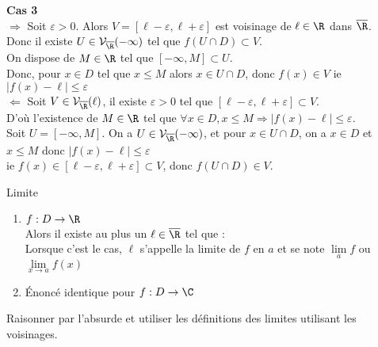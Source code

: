 \documentclass[12pt,a4paper]{report}
\begin{document}
\begin{demo}
\textbf{Cas 3} \\
	$\Longrightarrow$ Soit $\varepsilon > 0$. Alors $V=[\ell-\varepsilon,\ell+\varepsilon]$ est voisinage de $\ell \in \R$ dans $\overline{\R}$. \\
Donc il existe $U \in \mathcal{V}_{\overline{\R}}(-\infty)$ tel que $f(U \cap D) \subset V$. \\
On dispose de $M \in \R$ tel que $[-\infty,M] \subset U$. \\
Donc, pour $x \in D$ tel que $x \leq M$ alors $x \in U \cap D$, donc $f(x) \in V$ ie $\lvert f(x)-\ell \rvert \leq \varepsilon$ \\

	$\Longleftarrow$ Soit $V \in \mathcal{V}_{\overline{\R}}(\ell)$, il existe $\varepsilon > 0$ tel que $[\ell-\varepsilon, \ell + \varepsilon] \subset V$. \\
D'où l'existence de $M \in \R$ tel que $\forall x \in D, x \leq M \Longrightarrow \lvert f(x)-\ell \rvert \leq \varepsilon$. \\
Soit $U = [-\infty, M]$. On a $U \in \mathcal{V}_{\overline{\R}}(-\infty)$, et pour $x \in U \cap D$, on a $x \in D$ et $x \leq M$ donc $\lvert f(x)-\ell \rvert \leq \varepsilon$ \\
ie $f(x) \in [\ell-\varepsilon,\ell + \varepsilon] \subset V$, donc $f(U \cap D) \in V$.

\end{demo}
\begin{definition}{Limite}{}
\begin{enumerate}
    \item $f:D \rightarrow \R$\\
    Alors il existe au plus un $\ell \in \overline{\R}$ tel que : \\
    Lorsque c'est le cas, $\ell$ s'appelle la limite de $f$ en $a$ et se note $\lim\limits_a f$ ou $\lim\limits_{x \rightarrow a} f(x)$
    \item Énoncé identique pour $f:D \rightarrow \C$
\end{enumerate}
\end{definition}

\begin{principedemo}{}
Raisonner par l'absurde et utiliser les définitions des limites utilisant les voisinages.
\end{principedemo}
\end{document}
